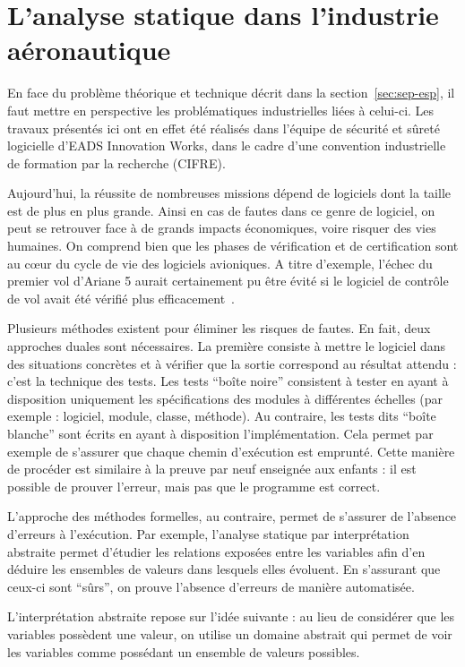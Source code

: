 \section{L'analyse statique dans l'industrie aéronautique}

En face du problème théorique et technique décrit dans la
section~\ref{sec:sep-esp}, il faut mettre en perspective les problématiques
industrielles liées à celui-ci. Les travaux présentés ici ont en effet été
réalisés dans l'équipe de sécurité et sûreté logicielle d'EADS Innovation Works,
dans le cadre d'une convention industrielle de formation par la recherche
(CIFRE).

Aujourd'hui, la réussite de nombreuses missions dépend de logiciels dont la
taille est de plus en plus grande. Ainsi en cas de fautes dans ce genre de
logiciel, on peut se retrouver face à de grands impacts économiques, voire
risquer des vies humaines. On comprend bien que les phases de vérification et de
certification sont au cœur du cycle de vie des logiciels avioniques. A titre
d'exemple, l'échec du premier vol d'Ariane 5 aurait certainement pu être évité
si le logiciel de contrôle de vol avait été vérifié plus
efficacement~\cite{Ariane501}.

Plusieurs méthodes existent pour éliminer les risques de fautes. En fait, deux
approches duales sont nécessaires. La première consiste à mettre le logiciel
dans des situations concrètes et à vérifier que la sortie correspond au résultat
attendu : c'est la technique des tests.  Les tests \enquote{boîte noire}
consistent à tester en ayant à disposition uniquement les spécifications des
modules à différentes échelles (par exemple : logiciel, module, classe,
méthode). Au contraire, les tests dits \enquote{boîte blanche} sont écrits en
ayant à disposition l'implémentation. Cela permet par exemple de s'assurer que
chaque chemin d'exécution est emprunté. Cette manière de procéder est similaire
à la preuve par neuf enseignée aux enfants : il est possible de prouver
l'erreur, mais pas que le programme est correct.

L'approche des méthodes formelles, au contraire, permet de s'assurer de
l'absence d'erreurs à l'exécution. Par exemple, l'analyse statique par
interprétation abstraite permet d'étudier les relations exposées entre les
variables afin d'en déduire les ensembles de valeurs dans lesquels elles
évoluent. En s'assurant que ceux-ci sont \enquote{sûrs}, on prouve l'absence
d'erreurs de manière automatisée.

L'interprétation abstraite repose sur l'idée suivante : au lieu de considérer
que les variables possèdent une valeur, on utilise un domaine abstrait qui
permet de voir les variables comme possédant un ensemble de valeurs possibles.

